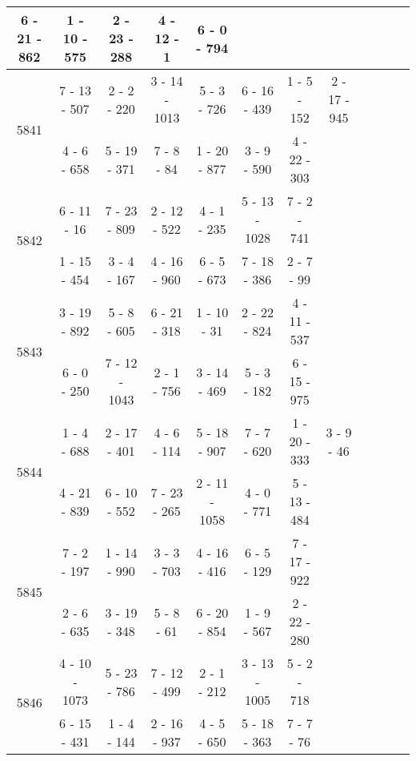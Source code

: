 \begin{longtable}{c | c | c | c | c | c | c | c | c | c | c | c}
6 - 21 - 862
&
1 - 10 - 575
&
2 - 23 - 288
&
4 - 12 - 1
&
6 - 0 - 794
&\space\\\hline
\multirow{2}{*}{5841}
& 7 - 13 - 507
&
2 - 2 - 220
&
3 - 14 - 1013
&
5 - 3 - 726
&
6 - 16 - 439
&
1 - 5 - 152
&
2 - 17 - 945
\\* \space
&
4 - 6 - 658
&
5 - 19 - 371
&
7 - 8 - 84
&
1 - 20 - 877
&
3 - 9 - 590
&
4 - 22 - 303
&\space\\\hline
\multirow{2}{*}{5842}
& 6 - 11 - 16
&
7 - 23 - 809
&
2 - 12 - 522
&
4 - 1 - 235
&
5 - 13 - 1028
&
7 - 2 - 741
&\space\\* \space
&
1 - 15 - 454
&
3 - 4 - 167
&
4 - 16 - 960
&
6 - 5 - 673
&
7 - 18 - 386
&
2 - 7 - 99
&\space\\\hline
\multirow{2}{*}{5843}
& 3 - 19 - 892
&
5 - 8 - 605
&
6 - 21 - 318
&
1 - 10 - 31
&
2 - 22 - 824
&
4 - 11 - 537
&\space\\* \space
&
6 - 0 - 250
&
7 - 12 - 1043
&
2 - 1 - 756
&
3 - 14 - 469
&
5 - 3 - 182
&
6 - 15 - 975
&\space\\\hline
\multirow{2}{*}{5844}
& 1 - 4 - 688
&
2 - 17 - 401
&
4 - 6 - 114
&
5 - 18 - 907
&
7 - 7 - 620
&
1 - 20 - 333
&
3 - 9 - 46
\\* \space
&
4 - 21 - 839
&
6 - 10 - 552
&
7 - 23 - 265
&
2 - 11 - 1058
&
4 - 0 - 771
&
5 - 13 - 484
&\space\\\hline
\multirow{2}{*}{5845}
& 7 - 2 - 197
&
1 - 14 - 990
&
3 - 3 - 703
&
4 - 16 - 416
&
6 - 5 - 129
&
7 - 17 - 922
&\space\\* \space
&
2 - 6 - 635
&
3 - 19 - 348
&
5 - 8 - 61
&
6 - 20 - 854
&
1 - 9 - 567
&
2 - 22 - 280
&\space\\\hline
\multirow{2}{*}{5846}
& 4 - 10 - 1073
&
5 - 23 - 786
&
7 - 12 - 499
&
2 - 1 - 212
&
3 - 13 - 1005
&
5 - 2 - 718
&\space\\* \space
&
6 - 15 - 431
&
1 - 4 - 144
&
2 - 16 - 937
&
4 - 5 - 650
&
5 - 18 - 363
&
7 - 7 - 76
&\space\\\hline

\end{longtable}
